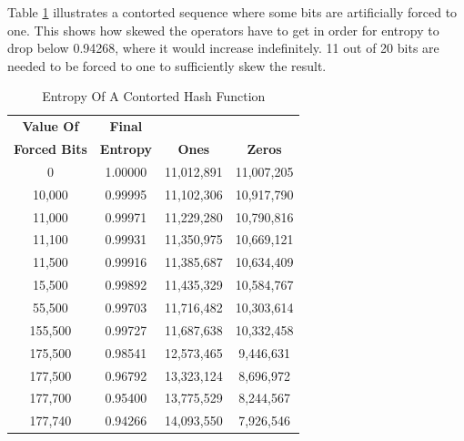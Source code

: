 \documentclass[preprint]{sigplanconf}
\begin{document}
Table \ref{table:entropyOfAContortedHashFunction} illustrates a contorted sequence where some bits are artificially forced to one. This shows how skewed the operators have to get in order for entropy to drop below 0.94268, where it would increase indefinitely. 11 out of 20 bits are needed to be forced to one to sufficiently skew the result.

\begin{table} [ht]
    \begin{center}
        \begin{tabular}{|c|c|c|c|}
            \hline
            \textbf{Value Of}    & \textbf{Final}   &               &                \\
            \textbf{Forced Bits} & \textbf{Entropy} & \textbf{Ones} & \textbf{Zeros} \\
            \hline
            0                    & 1.00000          & 11,012,891    & 11,007,205     \\
            10,000               & 0.99995          & 11,102,306    & 10,917,790     \\
            11,000               & 0.99971          & 11,229,280    & 10,790,816     \\
            11,100               & 0.99931          & 11,350,975    & 10,669,121     \\
            11,500               & 0.99916          & 11,385,687    & 10,634,409     \\
            15,500               & 0.99892          & 11,435,329    & 10,584,767     \\
            55,500               & 0.99703          & 11,716,482    & 10,303,614     \\
            155,500              & 0.99727          & 11,687,638    & 10,332,458     \\
            175,500              & 0.98541          & 12,573,465    & 9,446,631      \\
            177,500              & 0.96792          & 13,323,124    & 8,696,972      \\
            177,700              & 0.95400          & 13,775,529    & 8,244,567      \\
            177,740              & 0.94266          & 14,093,550    & 7,926,546      \\
            \hline
        \end{tabular}
        \caption{Entropy Of A Contorted Hash Function}
        \label{table:entropyOfAContortedHashFunction}
    \end{center}
\end{table}
\end{document}
